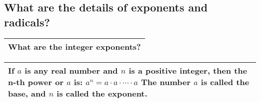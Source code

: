 \subsection{What are the details of exponents and radicals?}

\begin{small}
    \begin{tabularx}{1\textwidth}{
            p{}
        }
        \toprule
        \textbf{What are the integer exponents?} \\
        \bottomrule
    \end{tabularx}
\end{small}

\begin{small}
    \begin{tabularx}{1\textwidth}{
            p{}
        }
        \toprule
        \makecell{
        If $a$ is any real number and $n$ is a positive integer, then the n-th
        power or $a$ is:\\
        $a^n = a \cdot a \cdot \cdots \cdot a$\\
        The number $a$ is called the base, and $n$ is called the exponent.
        }
        \\
        \bottomrule
    \end{tabularx}
\end{small}

